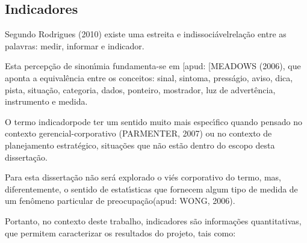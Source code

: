 \documentclass[
12pt,		%
openright,	%
twoside,  %
a4paper,			%
chapter=TITLE,		%
english,			%
french,				%
spanish,			%
brazil				%
]{USPSC-classe/USPSC}
\begin{document}
\subsection[Indicadores]{Indicadores}\label{Indicadores}
Segundo  Rodrigues (2010)  existe uma \textquotedbl estreita e indissoci\'avel\textquotedbl  rela\c{c}\~ao entre as palavras: medir, informar e \textquotedbl indicador\textquotedbl .









Esta percep\c{c}\~ao de sinon\'{\i}mia fundamenta-se em [apud: [MEADOWS (2006), que aponta a equival\^encia entre os conceitos: sinal, sintoma, press\'agio, aviso, dica, pista, situa\c{c}\~ao, categoria, dados, ponteiro, mostrador, luz de advert\^encia, instrumento e medida.









O termo \textquotedbl indicador\textquotedbl  pode ter um sentido muito mais espec\'{\i}fico quando pensado no contexto gerencial-corporativo (PARMENTER, 2007) ou no contexto de planejamento estrat\'egico, situa\c{c}\~oes que n\~ao est\~ao dentro do escopo desta disserta\c{c}\~ao.









Para esta disserta\c{c}\~ao n\~ao ser\'a explorado o vi\'es corporativo do termo, mas, diferentemente, o sentido de \textquotedbl estat\'{\i}sticas que fornecem algum tipo de medida de um fen\^omeno particular de preocupa\c{c}\~ao\textquotedbl  (apud: WONG, 2006).









Portanto, no contexto deste trabalho, indicadores s\~ao informa\c{c}\~oes quantitativas, que permitem caracterizar os resultados do projeto, tais como:
\end{document}
